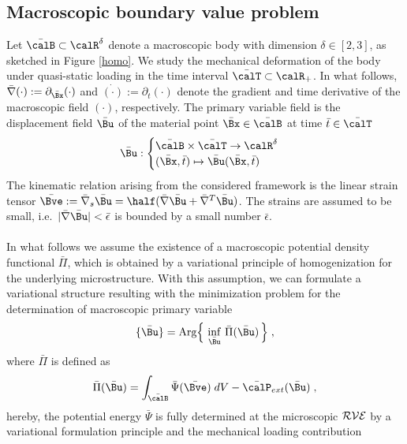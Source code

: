\documentclass[final,3p,times]{elsarticle}
\begin{document}
\subsection{Macroscopic boundary value problem}
%
Let $\bar\calB\subset\calR^\delta$ denote a macroscopic body with dimension
$\delta\in [2,3]$, as sketched in Figure \ref{homo}.
We study the mechanical deformation of the body under quasi-static loading in the time interval $\bar\calT \subset \calR_+$. In what follows, 
$\bar\nabla (\cdot) := \partial_{\bar\Bx}(\cdot)$ and 
$\dot{(\cdot)} := \partial_{t}(\cdot)$ denote the gradient and time derivative
of the macroscopic field $(\cdot)$, respectively. The primary variable field is the {displacement field} $\bar\Bu$ of the material
point $\bar\Bx\in\bar\calB$ at time $\bar t \in \bar\calT$
\begin{equation}
\bar\Bu : 
\begin{cases}
\bar\calB \times \bar\calT \rightarrow \calR^\delta \\
(\bar\Bx,\bar t) \mapsto \bar\Bu(\bar\Bx,\bar t)
\end{cases} 
\label{eq:homo1}
\end{equation}
%
The kinematic relation arising from the considered framework is the linear strain tensor $\bar\Bve
:= \bar\nabla_s\bar\Bu = \half (\bar\nabla\bar\Bu
+ \bar\nabla^T\bar\Bu)$. The strains are assumed to be small, i.e.\ $| \bar\nabla\bar\Bu | <
\bar\epsilon$ is bounded by a small number $\bar\epsilon$.
\\
\\
In what follows we assume the existence of a macroscopic potential density functional $\bar\Pi$, which is obtained by a variational principle of homogenization for the underlying microstructure. With this assumption, we can formulate a variational structure resulting with the minimization problem for the determination of macroscopic primary variable  
%
\begin{equation}
\{ \bar\Bu\}
= \mbox{Arg} \Big\{ \, \inf_{\bar\Bu}  \,
\bar \Pi(\bar\Bu) \, \Big\} \; ,
\label{eq:homo2}
\end{equation}
%
where $\bar\Pi$ is defined as
%
\begin{equation}
\bar\Pi(\bar\Bu) = \int_{\bar\calB} \bar \Psi(\bar\Bve)\; dV
- \bar\calP_{ext}(\bar\Bu) \; ,
\label{eq:homo3}
\end{equation}
%
hereby, the potential energy $\bar \Psi$ is fully determined at the microscopic $\cal{RVE}$ by a variational formulation principle and the mechanical loading contribution
\end{document}
